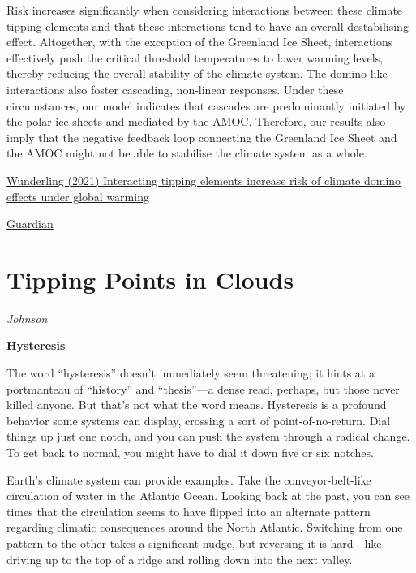 \documentclass[
]{book}
\begin{document}
Risk increases significantly when considering interactions between these climate tipping elements and that these interactions tend to have an overall destabilising effect. Altogether, with the exception of the Greenland Ice Sheet, interactions effectively push the critical threshold temperatures to lower warming levels, thereby reducing the overall stability of the climate system. The domino-like interactions also foster cascading, non-linear responses. Under these circumstances, our model indicates that cascades are predominantly initiated by the polar ice sheets and mediated by the AMOC. Therefore, our results also imply that the negative feedback loop connecting the Greenland Ice Sheet and the AMOC might not be able to stabilise the climate system as a whole.

\href{https://esd.copernicus.org/articles/12/601/2021/}{Wunderling (2021) Interacting tipping elements increase risk of climate domino effects under global warming}

\href{https://www.theguardian.com/environment/2021/jun/03/climate-tipping-points-could-topple-like-dominoes-warn-scientists}{Guardian}

\hypertarget{tipping-points-in-clouds}{%
\section{Tipping Points in Clouds}\label{tipping-points-in-clouds}}

\emph{Johnson}

\textbf{Hysteresis}

The word ``hysteresis'' doesn't immediately seem threatening; it hints at a portmanteau of ``history'' and ``thesis''---a dense read, perhaps, but those never killed anyone. But that's not what the word means. Hysteresis is a profound behavior some systems can display, crossing a sort of point-of-no-return. Dial things up just one notch, and you can push the system through a radical change. To get back to normal, you might have to dial it down five or six notches.

Earth's climate system can provide examples. Take the conveyor-belt-like circulation of water in the Atlantic Ocean. Looking back at the past, you can see times that the circulation seems to have flipped into an alternate pattern regarding climatic consequences around the North Atlantic. Switching from one pattern to the other takes a significant nudge, but reversing it is hard---like driving up to the top of a ridge and rolling down into the next valley.
\end{document}
